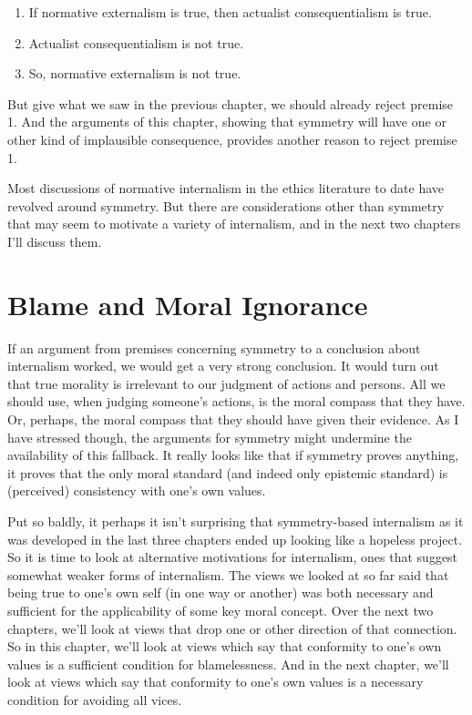 \documentclass[
  10pt,
  letterpaper,
  twoside]{scrbook}
\providecommand{\tightlist}{%
  \setlength{\itemsep}{0pt}\setlength{\parskip}{0pt}}\usepackage{longtable,booktabs,array}
\begin{document}
\begin{enumerate}
\def\labelenumi{\arabic{enumi}.}
\tightlist
\item
  If normative externalism is true, then actualist consequentialism is
  true.
\item
  Actualist consequentialism is not true.
\item
  So, normative externalism is not true.
\end{enumerate}

But give what we saw in the previous chapter, we should already reject
premise 1. And the arguments of this chapter, showing that symmetry will
have one or other kind of implausible consequence, provides another
reason to reject premise 1.

Most discussions of normative internalism in the ethics literature to
date have revolved around symmetry. But there are considerations other
than symmetry that may seem to motivate a variety of internalism, and in
the next two chapters I'll discuss them.

\chapter{Blame and Moral Ignorance}\label{blameandmoralignorance}

If an argument from premises concerning symmetry to a conclusion about
internalism worked, we would get a very strong conclusion. It would turn
out that true morality is irrelevant to our judgment of actions and
persons. All we should use, when judging someone's actions, is the moral
compass that they have. Or, perhaps, the moral compass that they should
have given their evidence. As I have stressed though, the arguments for
symmetry might undermine the availability of this fallback. It really
looks like that if symmetry proves anything, it proves that the only
moral standard (and indeed only epistemic standard) is (perceived)
consistency with one's own values.

Put so baldly, it perhaps it isn't surprising that symmetry-based
internalism as it was developed in the last three chapters ended up
looking like a hopeless project. So it is time to look at alternative
motivations for internalism, ones that suggest somewhat weaker forms of
internalism. The views we looked at so far said that being true to one's
own self (in one way or another) was both necessary and sufficient for
the applicability of some key moral concept. Over the next two chapters,
we'll look at views that drop one or other direction of that connection.
So in this chapter, we'll look at views which say that conformity to
one's own values is a sufficient condition for blamelessness. And in the
next chapter, we'll look at views which say that conformity to one's own
values is a necessary condition for avoiding all vices.
\end{document}

